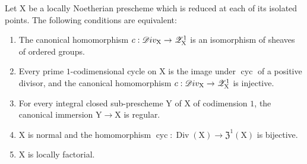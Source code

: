 \begin{proposition}[21.7.4]
\label{IV.21.7.4}
Let $\mathrm{X}$ be a locally Noetherian prescheme which is reduced at each of its isolated points.
The following conditions are equivalent:
\begin{enumerate}
  \item[\emph{a)}] The canonical homomorphism $c:\mathscr{D}iv_\mathrm{X}\to\mathscr{Z}_\mathrm{X}^1$  is an isomorphism of sheaves of ordered groups.
  \item[\emph{a$'$)}] Every prime $1$-codimensional cycle on $\mathrm{X}$ is the image under $\operatorname{cyc}$ of a positive divisor, and the canonical homomorphism $c:\mathscr{D}iv_\mathrm{X}\to\mathscr{Z}_\mathrm{X}^1$ is injective.
  \item[\emph{a$''$)}] For every integral closed sub-prescheme $\mathrm{Y}$ of $\mathrm{X}$ of codimension $1$, the canonical immersion $\mathrm{Y}\to\mathrm{X}$ is regular.
  \item[\emph{b)}] $\mathrm{X}$ is normal and the homomorphism $\operatorname{cyc}:\operatorname{Div}(\mathrm{X})\to\mathfrak{Z}^1(\mathrm{X})$ is bijective.
  \item[\emph{c)}] $\mathrm{X}$ is locally factorial.
\end{enumerate}
\end{proposition}

